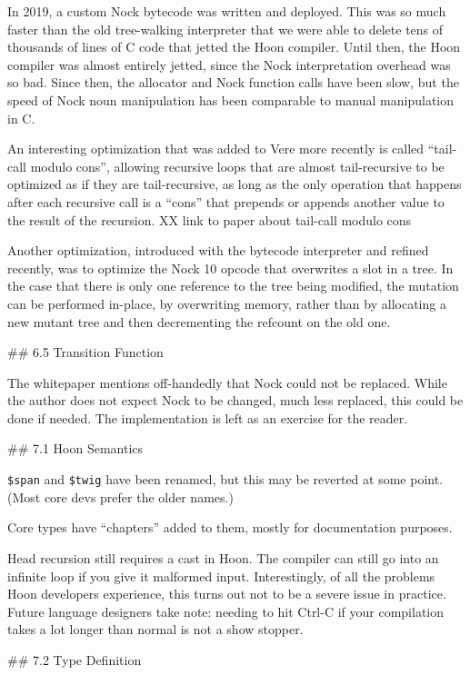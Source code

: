 \documentclass[twoside]{article}
\begin{document}
In 2019, a custom Nock bytecode was written and deployed.  This was so much faster than the old tree-walking interpreter that we were able to delete tens of thousands of lines of C code that jetted the Hoon compiler.  Until then, the Hoon compiler was almost entirely jetted, since the Nock interpretation overhead was so bad.  Since then, the allocator and Nock function calls have been slow, but the speed of Nock noun manipulation has been comparable to manual manipulation in C.

An interesting optimization that was added to Vere more recently is called ``tail-call modulo cons'', allowing recursive loops that are almost tail-recursive to be optimized as if they are tail-recursive, as long as the only operation that happens after each recursive call is a ``cons'' that prepends or appends another value to the result of the recursion.
XX link to paper about tail-call modulo cons

Another optimization, introduced with the bytecode interpreter and refined recently, was to optimize the Nock 10 opcode that overwrites a slot in a tree.  In the case that there is only one reference to the tree being modified, the mutation can be performed in-place, by overwriting memory, rather than by allocating a new mutant tree and then decrementing the refcount on the old one.

## 6.5 Transition Function

The whitepaper mentions off-handedly that Nock could not be replaced.  While the author does not expect Nock to be changed, much less replaced, this could be done if needed.  The implementation is left as an exercise for the reader.

## 7.1 Hoon Semantics

\lstinline[style=inlinecode]{$span} and \lstinline[style=inlinecode]{$twig} have been renamed, but this may be reverted at some point.  (Most core devs prefer the older names.)

Core types have ``chapters'' added to them, mostly for documentation purposes.

Head recursion still requires a cast in Hoon.  The compiler can still go into an infinite loop if you give it malformed input.  Interestingly, of all the problems Hoon developers experience, this turns out not to be a severe issue in practice.  Future language designers take note: needing to hit Ctrl-C if your compilation takes a lot longer than normal is not a show stopper.

## 7.2 Type Definition
\end{document}
